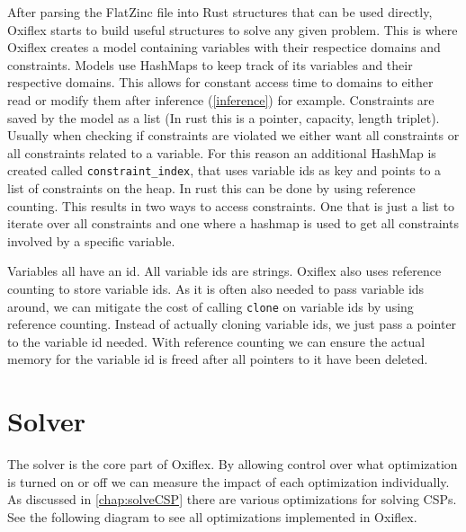 After parsing the FlatZinc file into Rust structures that can be used directly, Oxiflex starts to build useful structures  to solve any given problem. This is where Oxiflex creates a model containing variables with their respectice domains and constraints. Models use HashMaps to keep track of its variables and their respective domains. This allows for constant access time to domains to either read or modify them after inference (\ref{inference}) for example. Constraints are saved by the model as a list (In rust this is a pointer, capacity, length triplet). Usually when checking if constraints are violated we either want all constraints or all constraints related to a variable. For this reason an additional HashMap is created called \verb|constraint_index|, that uses variable ids as key and points to a list of constraints on the heap. In rust this can be done by using reference counting. This results in two ways to access constraints. One that is just a list to iterate over all constraints and one where a hashmap is used to get all constraints involved by a specific variable.

Variables all have an id. All variable ids are strings. Oxiflex also uses reference counting to store variable ids. As it is often also needed to pass variable ids around, we can mitigate the cost of calling \verb|clone| on variable ids by using reference counting. Instead of actually cloning variable ids, we just pass a pointer to the variable id needed. With reference counting we can ensure the actual memory for the variable id is freed after all pointers to it have been deleted.

\section{Solver}

The solver is the core part of Oxiflex. By allowing control over what optimization is turned on or off we can measure the impact of each optimization individually. As discussed in \cref{chap:solveCSP} there are various optimizations for solving CSPs. See the following diagram to see all optimizations implemented in Oxiflex. \\

